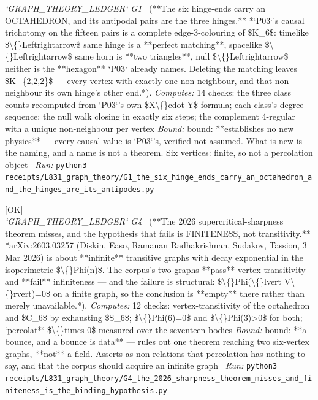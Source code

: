 \begin{description}
\textit{`GRAPH\_THEORY\_LEDGER` G1} \ (**The six hinge-ends carry an OCTAHEDRON, and its antipodal pairs are the three hinges.** *`P03`'s causal trichotomy on the fifteen pairs is a complete edge-3-colouring of \$K\_6\$: timelike \$\textbackslash\{\}Leftrightarrow\$ same hinge is a **perfect matching**, spacelike \$\textbackslash\{\}Leftrightarrow\$ same horn is **two triangles**, null \$\textbackslash\{\}Leftrightarrow\$ neither is the **hexagon** `P03` already names. Deleting the matching leaves \$K\_\{2,2,2\}\$ --- every vertex with exactly one non-neighbour, and that non-neighbour its own hinge's other end.*). 
\emph{Computes:} 14 checks: the three class counts recomputed from `P03`'s own \$X\textbackslash\{\}cdot Y\$ formula; each class's degree sequence; the null walk closing in exactly six steps; the complement 4-regular with a unique non-neighbour per vertex
 \emph{Bound:} bound: **establishes no new physics** --- every causal value is `P03`'s, verified not assumed. What is new is the naming, and a name is not a theorem. Six vertices: finite, so not a percolation object
\ \emph{Run:} \texttt{python3 receipts/L831\_graph\_theory/G1\_the\_six\_hinge\_ends\_carry\_an\_octahedron\_and\_the\_hinges\_are\_its\_antipodes.py}
\item[\label{rcpt:G4_the_2026_sharpness_theorem_misses_and_finiteness_is_the_binding_hypothesis}\texttt{G4\_the\_2026\_sharpness\_theorem\_misses\_and\_finiteness\_is\_the\_binding\_hypothesis}]\hfill\textsf{[OK]}\\
\textit{`GRAPH\_THEORY\_LEDGER` G4} \ (**The 2026 supercritical-sharpness theorem misses, and the hypothesis that fails is FINITENESS, not transitivity.** *arXiv:2603.03257 (Diskin, Easo, Ramanan Radhakrishnan, Sudakov, Tassion, 3 Mar 2026) is about **infinite** transitive graphs with decay exponential in the isoperimetric \$\textbackslash\{\}Phi(n)\$. The corpus's two graphs **pass** vertex-transitivity and **fail** infiniteness --- and the failure is structural: \$\textbackslash\{\}Phi(\textbackslash\{\}lvert V\textbackslash\{\}rvert)=0\$ on a finite graph, so the conclusion is **empty** there rather than merely unavailable.*). 
\emph{Computes:} 12 checks: vertex-transitivity of the octahedron and \$C\_6\$ by exhausting \$S\_6\$; \$\textbackslash\{\}Phi(6)=0\$ and \$\textbackslash\{\}Phi(3)>0\$ for both; `percolat*` \$\textbackslash\{\}times 0\$ measured over the seventeen bodies
 \emph{Bound:} bound: **a bounce, and a bounce is data** --- rules out one theorem reaching two six-vertex graphs, **not** a field. Asserts as non-relations that percolation has nothing to say, and that the corpus should acquire an infinite graph
\ \emph{Run:} \texttt{python3 receipts/L831\_graph\_theory/G4\_the\_2026\_sharpness\_theorem\_misses\_and\_finiteness\_is\_the\_binding\_hypothesis.py}
\end{description}\endgroup
